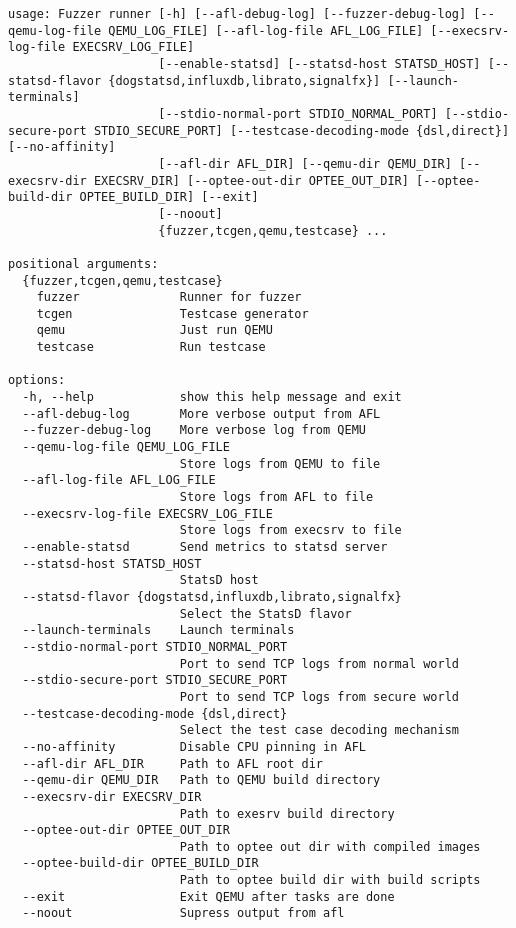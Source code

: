 \begin{lstlisting}[caption={Fuzzing runner tool.}, label={lst:runtool}]
usage: Fuzzer runner [-h] [--afl-debug-log] [--fuzzer-debug-log] [--qemu-log-file QEMU_LOG_FILE] [--afl-log-file AFL_LOG_FILE] [--execsrv-log-file EXECSRV_LOG_FILE]
                     [--enable-statsd] [--statsd-host STATSD_HOST] [--statsd-flavor {dogstatsd,influxdb,librato,signalfx}] [--launch-terminals]
                     [--stdio-normal-port STDIO_NORMAL_PORT] [--stdio-secure-port STDIO_SECURE_PORT] [--testcase-decoding-mode {dsl,direct}] [--no-affinity]
                     [--afl-dir AFL_DIR] [--qemu-dir QEMU_DIR] [--execsrv-dir EXECSRV_DIR] [--optee-out-dir OPTEE_OUT_DIR] [--optee-build-dir OPTEE_BUILD_DIR] [--exit]
                     [--noout]
                     {fuzzer,tcgen,qemu,testcase} ...

positional arguments:
  {fuzzer,tcgen,qemu,testcase}
    fuzzer              Runner for fuzzer
    tcgen               Testcase generator
    qemu                Just run QEMU
    testcase            Run testcase

options:
  -h, --help            show this help message and exit
  --afl-debug-log       More verbose output from AFL
  --fuzzer-debug-log    More verbose log from QEMU
  --qemu-log-file QEMU_LOG_FILE
                        Store logs from QEMU to file
  --afl-log-file AFL_LOG_FILE
                        Store logs from AFL to file
  --execsrv-log-file EXECSRV_LOG_FILE
                        Store logs from execsrv to file
  --enable-statsd       Send metrics to statsd server
  --statsd-host STATSD_HOST
                        StatsD host
  --statsd-flavor {dogstatsd,influxdb,librato,signalfx}
                        Select the StatsD flavor
  --launch-terminals    Launch terminals
  --stdio-normal-port STDIO_NORMAL_PORT
                        Port to send TCP logs from normal world
  --stdio-secure-port STDIO_SECURE_PORT
                        Port to send TCP logs from secure world
  --testcase-decoding-mode {dsl,direct}
                        Select the test case decoding mechanism
  --no-affinity         Disable CPU pinning in AFL
  --afl-dir AFL_DIR     Path to AFL root dir
  --qemu-dir QEMU_DIR   Path to QEMU build directory
  --execsrv-dir EXECSRV_DIR
                        Path to exesrv build directory
  --optee-out-dir OPTEE_OUT_DIR
                        Path to optee out dir with compiled images
  --optee-build-dir OPTEE_BUILD_DIR
                        Path to optee build dir with build scripts
  --exit                Exit QEMU after tasks are done
  --noout               Supress output from afl
\end{lstlisting}
